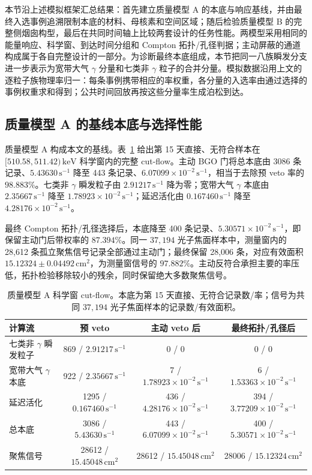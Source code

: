 \documentclass[11pt]{article}
\newcommand{\revblue}[1]{\textcolor{revisionblue}{#1}}
\newcommand{\keV}{\,\mathrm{keV}}
\newcommand{\cps}{\,\mathrm{s^{-1}}}
\begin{document}
本节沿上述模拟框架汇总结果：首先建立质量模型 A 的本底与响应基线，并由最终入选事例追溯限制本底的材料、母核素和空间区域；随后检验质量模型 B 的完整侧烟囱构型，最后在共同时间轴上比较两套设计的任务性能。两模型采用相同的能量响应、科学窗、到达时间分组和 Compton 拓扑/孔径判据；主动屏蔽的通道构成属于各自完整设计的一部分。\revblue{为诊断最终本底组成，本节把同一八族瞬发分支进一步表示为宽带大气 $\gamma$ 分量和七类非 $\gamma$ 粒子的合并分量。模拟数据沿用上文的逐粒子族物理率归一：每条事例携带相应的率权重，各分量的入选率由通过选择的事例权重求和得到；公共时间回放再按这些分量率生成泊松到达。}

\subsection{质量模型 A 的基线本底与选择性能}
\label{subsec:model_a_baseline_zh}
\label{subsec:reference_background_results_zh}

质量模型 A 构成本文的基线。表~\ref{tab:phase2_cutflow} 给出第 15 天直接、无符合样本在 $[510.58,511.42)\keV$ 科学窗内的完整 cut-flow。主动 BGO 门将总本底由 3086 条记录、$5.43630\cps$ 降至 443 条记录、$6.07099\times10^{-2}\cps$，相当于去除预 veto 率的 $98.883\%$。\revblue{七类非 $\gamma$ 瞬发粒子}由 $2.91217\cps$ 降为零；宽带大气 $\gamma$ 本底由 $2.35667\cps$ 降至 $1.78923\times10^{-2}\cps$；延迟活化由 $0.167460\cps$ 降至 $4.28176\times10^{-2}\cps$。

最终 Compton 拓扑/孔径选择后，本底降至 400 条记录、$5.30571\times10^{-2}\cps$，即保留主动门后带权率的 $87.394\%$。同一 $37{,}194$ 光子焦面样本中，测量窗内的 28,612 条孤立聚焦信号记录全部通过主动门；最终保留 28,006 条，对应有效面积 $15.12324\pm0.04492\,\mathrm{cm^2}$，为测量窗信号的 $97.882\%$。主动反符合承担主要的率压低，拓扑检验移除较小的残余，同时保留绝大多数聚焦信号。

\begin{table}[H]
\centering
\caption{质量模型 A 科学窗 cut-flow。本底为第 15 天直接、无符合记录数/率；信号为共同 $37{,}194$ 光子焦面样本的记录数/有效面积。}
\label{tab:phase2_cutflow}
\footnotesize
\begin{tabular}{lccc}
\toprule
计算流 & 预 veto & 主动 veto 后 & 最终拓扑/孔径后 \\
\midrule
\revblue{七类非 $\gamma$ 瞬发粒子} & 869 / $2.91217\cps$ & 0 / 0 & 0 / 0 \\
宽带大气 $\gamma$ 本底 & 922 / $2.35667\cps$ & 7 / $1.78923\times10^{-2}\cps$ & 6 / $1.53363\times10^{-2}\cps$ \\
延迟活化 & 1295 / $0.167460\cps$ & 436 / $4.28176\times10^{-2}\cps$ & 394 / $3.77209\times10^{-2}\cps$ \\
总本底 & 3086 / $5.43630\cps$ & 443 / $6.07099\times10^{-2}\cps$ & 400 / $5.30571\times10^{-2}\cps$ \\
聚焦信号 & 28612 / $15.45048\,\mathrm{cm^2}$ & 28612 / $15.45048\,\mathrm{cm^2}$ & 28006 / $15.12324\,\mathrm{cm^2}$ \\
\bottomrule
\end{tabular}
\end{table}
\end{document}
